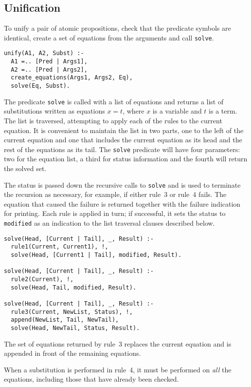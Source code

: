 \documentclass[11pt]{article}
\newcommand*{\p}[1]{\textup{\texttt{#1}}}
\begin{document}
\subsection{Unification}\label{s.unif}

To unify a pair of atomic propositions, check that the predicate
symbols are identical, create a set of equations from the arguments and
call \p{solve}.

\begin{verbatim}
unify(A1, A2, Subst) :-
  A1 =.. [Pred | Args1],
  A2 =.. [Pred | Args2],
  create_equations(Args1, Args2, Eq),
  solve(Eq, Subst).
\end{verbatim}

The predicate \p{solve} is called with a list of equations and returns a
list of substitutions written as equations $x=t$, where $x$ is a
variable and $t$ is a term. The list is traversed, attempting to apply
each of the rules to the current equation. It is convenient to maintain
the list in two parts, one to the left of the current equation and one
that includes the current equation as its head and the rest of the
equations as its tail. The \p{solve} predicate will have four
parameters: two for the equation list, a third for status information
and the fourth will return the solved set.

The status is passed down the recursive calls to \p{solve} and is used
to terminate the recursion as necessary, for example, if either rule~3
or rule~4 fails. The equation that caused the failure is returned
together with the failure indication for printing. Each rule is applied
in turn; if successful, it sets the status to \p{modified} as an
indication to the list traversal clauses described below.

\begin{verbatim}
solve(Head, [Current | Tail], _, Result) :-
  rule1(Current, Current1), !,
  solve(Head, [Current1 | Tail], modified, Result).

solve(Head, [Current | Tail], _, Result) :-
  rule2(Current), !,
  solve(Head, Tail, modified, Result).

solve(Head, [Current | Tail], _, Result) :-
  rule3(Current, NewList, Status), !,
  append(NewList, Tail, NewTail),
  solve(Head, NewTail, Status, Result).
\end{verbatim}

The set of equations returned by rule~3 replaces the current equation
and is appended in front of the remaining equations.

When a substitution is performed in rule~4, it must be performed on
\emph{all} the equations, including those that have already been
checked.
\end{document}
